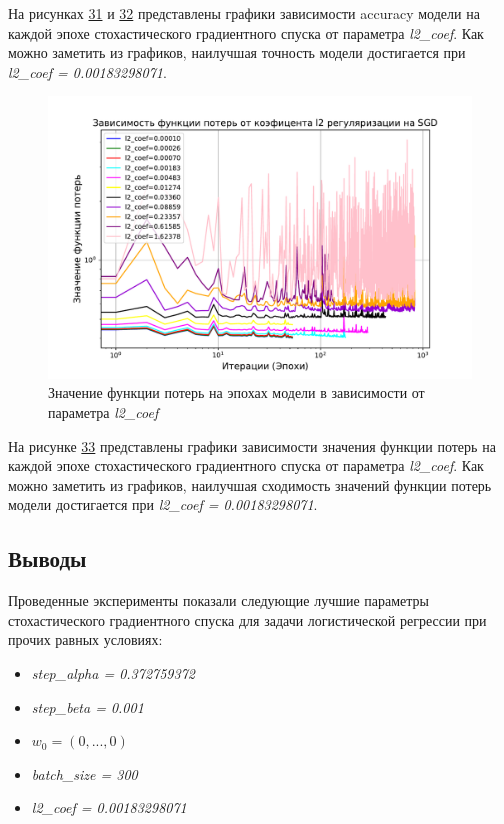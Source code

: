 \documentclass[14pt]{extarticle}
\begin{document}
На рисунках \hyperref[fig:exp_5_acc_l2_1]{31} и \hyperref[fig:exp_5_acc_l2_2]{32} представлены графики зависимости accuracy модели на каждой эпохе стохастического градиентного спуска от параметра \textit{l2\_coef}. Как можно заметить из графиков, наилучшая точность модели достигается при \textit{l2\_coef = 0.00183298071}.

\begin{figure}[H]
    \centering
    \includegraphics[width=0.7\linewidth]
    {exp_5_loss_l2_1.pdf}
    \caption{Значение функции потерь на эпохах модели в зависимости от параметра \textit{l2\_coef}}
    \label{fig:exp_5_loss_l2_1}
\end{figure}


На рисунке \hyperref[fig:exp_5_loss_l2_1]{33} представлены графики зависимости значения функции потерь на каждой эпохе стохастического градиентного спуска от параметра \textit{l2\_coef}. Как можно заметить из графиков, наилучшая сходимость значений функции потерь модели достигается при \textit{l2\_coef = 0.00183298071}.

\subsection{Выводы}
Проведенные эксперименты показали следующие лучшие параметры стохастического градиентного спуска для задачи логистической регрессии при прочих равных условиях:
\begin{itemize}
    \item \textit{step\_alpha = 0.372759372}
    \item \textit{step\_beta = 0.001}
    \item \textit{$ w_0 = (0, ... , 0)$}
    \item \textit{batch\_size = 300}
    \item \textit{l2\_coef = 0.00183298071}
\end{itemize}
\end{document}
